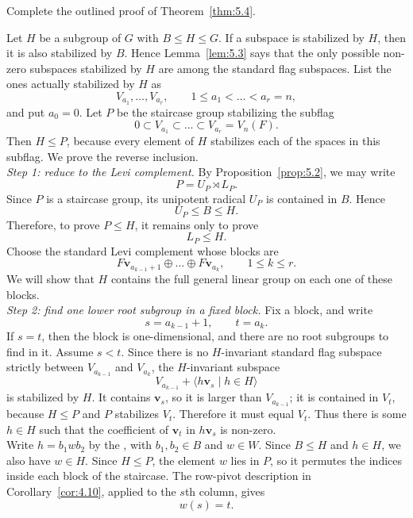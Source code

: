 \documentclass[../Odyssey_Project.tex]{subfiles}
\begin{document}
\begin{exercise}
\label{ex:5.7}
Complete the outlined proof of Theorem~\ref{thm:5.4}.
\end{exercise}
\begin{solution}
Let $H$ be a subgroup of $G$ with $B\leq H\leq G$. If a subspace is stabilized by $H$, then it is also stabilized by $B$. Hence Lemma~\ref{lem:5.3} says that the only possible non-zero subspaces stabilized by $H$ are among the standard flag subspaces. List the ones actually stabilized by $H$ as
\[
    V_{a_1},\dots,V_{a_r},
    \qquad
    1\leq a_1<\dots<a_r=n,
\]
and put $a_0=0$. Let $P$ be the staircase group stabilizing the subflag
\[
    0\subset V_{a_1}\subset \dots\subset V_{a_r}=V_n(F).
\]
Then $H\leq P$, because every element of $H$ stabilizes each of the spaces in this subflag. We prove the reverse inclusion.\\
\textit{Step 1: reduce to the Levi complement.} By Proposition~\ref{prop:5.2}, we may write
\[
    P=U_P\rtimes L_P.
\]
Since $P$ is a staircase group, its unipotent radical $U_P$ is contained in $B$. Hence
\[
    U_P\leq B\leq H.
\]
Therefore, to prove $P\leq H$, it remains only to prove
\[
    L_P\leq H.
\]
Choose the standard Levi complement whose blocks are
\[
    F\mathbf{v}_{a_{k-1}+1}\oplus\dots\oplus F\mathbf{v}_{a_k},
    \qquad
    1\leq k\leq r.
\]
We will show that $H$ contains the full general linear group on each one of these blocks.\\
\textit{Step 2: find one lower root subgroup in a fixed block.} Fix a block, and write
\[
    s=a_{k-1}+1,\qquad t=a_k.
\]
If $s=t$, then the block is one-dimensional, and there are no root subgroups to find in it. Assume $s<t$. Since there is no $H$-invariant standard flag subspace strictly between $V_{a_{k-1}}$ and $V_{a_k}$, the $H$-invariant subspace
\[
    V_{a_{k-1}}+\langle h\mathbf{v}_s\mid h\in H\rangle
\]
is stabilized by $H$. It contains $\mathbf{v}_s$, so it is larger than $V_{a_{k-1}}$; it is contained in $V_t$, because $H\leq P$ and $P$ stabilizes $V_t$. Therefore it must equal $V_t$. Thus there is some $h\in H$ such that the coefficient of $\mathbf{v}_t$ in $h\mathbf{v}_s$ is non-zero.\\
Write $h=b_1wb_2$ by the , with $b_1,b_2\in B$ and $w\in W$. Since $B\leq H$ and $h\in H$, we also have $w\in H$. Since $H\leq P$, the element $w$ lies in $P$, so it permutes the indices inside each block of the staircase. The row-pivot description in Corollary~\ref{cor:4.10}, applied to the $s$th column, gives
\[
    w(s)=t.
\]
\end{solution}
\end{document}
